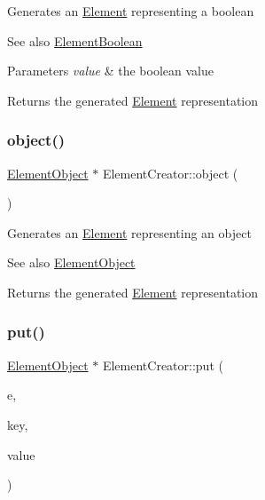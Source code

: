 Generates an \mbox{\hyperlink{classElement}{Element}} representing a boolean \begin{DoxySeeAlso}{See also}
\mbox{\hyperlink{classElementBoolean}{Element\+Boolean}}
\end{DoxySeeAlso}

\begin{DoxyParams}{Parameters}
{\em value} & the boolean value \\
\hline
\end{DoxyParams}
\begin{DoxyReturn}{Returns}
the generated \mbox{\hyperlink{classElement}{Element}} representation 
\end{DoxyReturn}
\mbox{\label{classElementCreator_a9ecb3456bf27d6f9b3c9f5f8130cfe63}} 
\subsubsection{\texorpdfstring{object()}{object()}}
{\footnotesize\ttfamily \mbox{\hyperlink{classElementObject}{Element\+Object}} $\ast$ Element\+Creator\+::object (\begin{DoxyParamCaption}{ }\end{DoxyParamCaption})\hspace{0.3cm}{\ttfamily [static]}}

Generates an \mbox{\hyperlink{classElement}{Element}} representing an object \begin{DoxySeeAlso}{See also}
\mbox{\hyperlink{classElementObject}{Element\+Object}}
\end{DoxySeeAlso}
\begin{DoxyReturn}{Returns}
the generated \mbox{\hyperlink{classElement}{Element}} representation 
\end{DoxyReturn}
\mbox{\label{classElementCreator_a741ad4af271f1dcc1a113d2f49189bb4}} 
\subsubsection{\texorpdfstring{put()}{put()}}
{\footnotesize\ttfamily \mbox{\hyperlink{classElementObject}{Element\+Object}} $\ast$ Element\+Creator\+::put (\begin{DoxyParamCaption}\item[{\mbox{\hyperlink{classElementObject}{Element\+Object}} $\ast$}]{e,  }\item[{const char $\ast$}]{key,  }\item[{\mbox{\hyperlink{classElement}{Element}} $\ast$}]{value }\end{DoxyParamCaption})\hspace{0.3cm}{\ttfamily [static]}}

